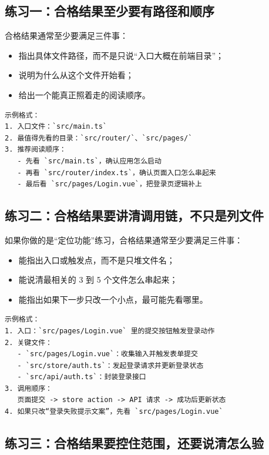 \documentclass[UTF8,a4paper,12pt]{ctexart}
\begin{document}
\subsection{练习一：合格结果至少要有路径和顺序}

合格结果通常至少要满足三件事：
\begin{itemize}
  \item 指出具体文件路径，而不是只说“入口大概在前端目录”；
  \item 说明为什么从这个文件开始看；
  \item 给出一个能真正照着走的阅读顺序。
\end{itemize}

\begin{lstlisting}[style=cli]
示例格式：
1. 入口文件：`src/main.ts`
2. 最值得先看的目录：`src/router/`、`src/pages/`
3. 推荐阅读顺序：
   - 先看 `src/main.ts`，确认应用怎么启动
   - 再看 `src/router/index.ts`，确认页面入口怎么串起来
   - 最后看 `src/pages/Login.vue`，把登录页逻辑补上
\end{lstlisting}

\subsection{练习二：合格结果要讲清调用链，不只是列文件}

如果你做的是“定位功能”练习，合格结果通常至少要满足三件事：
\begin{itemize}
  \item 能指出入口或触发点，而不是只堆文件名；
  \item 能说清最相关的 3 到 5 个文件怎么串起来；
  \item 能指出如果下一步只改一个小点，最可能先看哪里。
\end{itemize}

\begin{lstlisting}[style=cli]
示例格式：
1. 入口：`src/pages/Login.vue` 里的提交按钮触发登录动作
2. 关键文件：
   - `src/pages/Login.vue`：收集输入并触发表单提交
   - `src/store/auth.ts`：发起登录请求并更新登录状态
   - `src/api/auth.ts`：封装登录接口
3. 调用顺序：
   页面提交 -> store action -> API 请求 -> 成功后更新状态
4. 如果只改“登录失败提示文案”，先看 `src/pages/Login.vue`
\end{lstlisting}

\subsection{练习三：合格结果要控住范围，还要说清怎么验}
\end{document}
